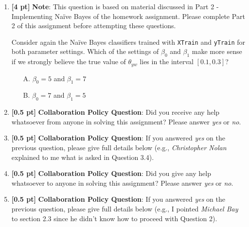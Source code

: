 \documentclass{article}
\begin{document}
\begin{enumerate}
    \item \textbf{[4 pt]} \textbf{Note}: This question is based on material discussed in Part 2 - Implementing Na{\"i}ve Bayes of the homework assignment. Please complete Part 2 of this assignment before attempting these questions.
    
    Consider again the Na{\"i}ve Bayes classifiers trained with \texttt{XTrain} and \texttt{yTrain} for both parameter settings. Which of the settings of $\beta_0$ and $\beta_1$ make more sense if we strongly believe the true value of $\theta_{yw}$ lies in the interval $[0.1, 0.3]$?
    \begin{itemize}
        \item[A.] $\beta_0=5$ and $\beta_1=7$
        \item[B.] $\beta_0=7$ and $\beta_1=5$
    \end{itemize}
    
    \begin{tcolorbox}[width=\linewidth/3,height=1.5cm]
    \end{tcolorbox}
    
    \item \textbf{[0.5 pt]} \textbf{Collaboration Policy Question}: Did you receive any help whatsoever from anyone in solving this assignment? Please answer \textit{yes} or \textit{no}.
    \begin{tcolorbox}[width=\linewidth/3,height=1.5cm]
    \end{tcolorbox}
    
    \item \textbf{[0.5 pt]} \textbf{Collaboration Policy Question}: If you answered \textit{yes} on the previous question, please give full details below (e.g., \textit{Christopher Nolan} explained to me what is asked in Question 3.4).
    \begin{tcolorbox}[height=1.5cm]
    \end{tcolorbox}
    
    \item \textbf{[0.5 pt]} \textbf{Collaboration Policy Question}: Did you give any help whatsoever to anyone in solving this assignment? Please answer \textit{yes} or \textit{no}.
    \begin{tcolorbox}[width=\linewidth/3,height=1.5cm]
    \end{tcolorbox}
    \newpage
    \item \textbf{[0.5 pt]} \textbf{Collaboration Policy Question}: If you answered \textit{yes} on the previous question, please give full details below (e.g., I pointed \textit{Michael Bay} to section 2.3 since he didn't know how to proceed with Question 2).
    \begin{tcolorbox}[height=1.5cm]
    \end{tcolorbox}
    


\end{enumerate}
\end{document}

